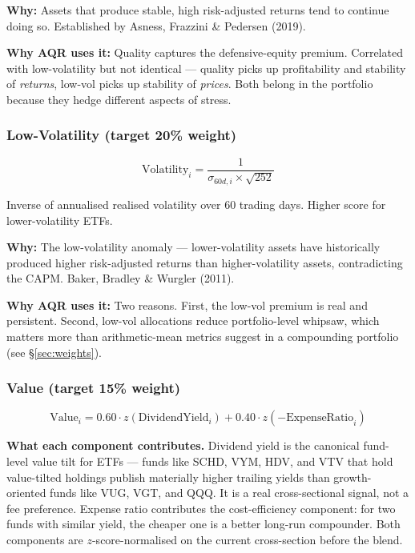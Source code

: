 \documentclass[11pt,a4paper]{article}
\begin{document}
\textbf{Why:} Assets that produce stable, high risk-adjusted returns tend to continue doing so. Established by Asness, Frazzini \& Pedersen (2019).

\textbf{Why AQR uses it:} Quality captures the defensive-equity premium. Correlated with low-volatility but not identical --- quality picks up profitability and stability of \emph{returns}, low-vol picks up stability of \emph{prices}. Both belong in the portfolio because they hedge different aspects of stress.

\subsubsection{Low-Volatility (target 20\% weight)}

\begin{equation}
\text{Volatility}_i = \frac{1}{\sigma_{60d,i} \times \sqrt{252}}
\end{equation}

Inverse of annualised realised volatility over 60 trading days. Higher score for lower-volatility ETFs.

\textbf{Why:} The low-volatility anomaly --- lower-volatility assets have historically produced higher risk-adjusted returns than higher-volatility assets, contradicting the CAPM. Baker, Bradley \& Wurgler (2011).

\textbf{Why AQR uses it:} Two reasons. First, the low-vol premium is real and persistent. Second, low-vol allocations reduce portfolio-level whipsaw, which matters more than arithmetic-mean metrics suggest in a compounding portfolio (see \S\ref{sec:weights}).

\subsubsection{Value (target 15\% weight)}

\begin{equation}
\text{Value}_i = 0.60 \cdot z(\text{DividendYield}_i) + 0.40 \cdot z(-\text{ExpenseRatio}_i)
\end{equation}

\textbf{What each component contributes.} Dividend yield is the canonical fund-level value tilt for ETFs --- funds like SCHD, VYM, HDV, and VTV that hold value-tilted holdings publish materially higher trailing yields than growth-oriented funds like VUG, VGT, and QQQ. It is a real cross-sectional signal, not a fee preference. Expense ratio contributes the cost-efficiency component: for two funds with similar yield, the cheaper one is a better long-run compounder. Both components are $z$-score-normalised on the current cross-section before the blend.
\end{document}
